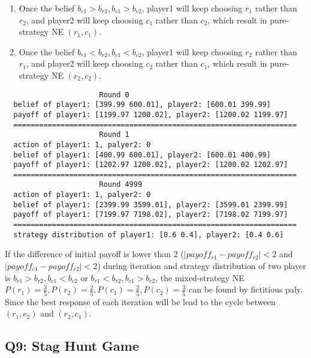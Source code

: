 \documentclass[a4paper, oneside, final, 12pt]{scrartcl} %
\begin{document}
\begin{enumerate}
  \item Once the belief $b_{r1} > b_{r2}, b_{c1} > b_{c2}$,
  player1 will keep choosing $r_1$ rather than $r_2$, 
  and player2 will keep choosing $c_1$ rather than $c_2$, 
  which result in pure-strategy NE $(r_1, c_1)$.
  \item Once the belief $b_{r1} < b_{r2}, b_{c1} < b_{c2}$,
  player1 will keep choosing $r_2$ rather than $r_1$, 
  and player2 will keep choosing $c_2$ rather than $c_1$, 
  which result in pure-strategy NE $(r_2, c_2)$.
\end{enumerate}
\endgroup

\newpage

\begin{lstlisting}
                      Round 0
  belief of player1: [399.99 600.01], player2: [600.01 399.99]
  payoff of player1: [1199.97 1200.02], player2: [1200.02 1199.97]
  ==================================================================
                      Round 1
  action of player1: 1, palyer2: 0
  belief of player1: [400.99 600.01], player2: [600.01 400.99]
  payoff of player1: [1202.97 1200.02], player2: [1200.02 1202.97]
  ==================================================================
                      Round 4999
  action of player1: 1, palyer2: 0
  belief of player1: [2399.99 3599.01], player2: [3599.01 2399.99]
  payoff of player1: [7199.97 7198.02], player2: [7198.02 7199.97]
  ==================================================================
  strategy distribution of player1: [0.6 0.4], player2: [0.4 0.6]
\end{lstlisting}

\begingroup
\raggedright
If the difference of initial payoff is lower than 2
($|payoff_{r1} - payoff_{r2}| < 2$ and $|payoff_{c1} - payoff_{c2}| < 2$) during iteration
and strategy distribution of two player is 
$b_{r1} > b_{r2}, b_{c1} < b_{c2}$  or  $b_{r1} < b_{r2}, b_{c1} > b_{c2}$, 
the mixed-strategy NE $P(r_1) = \frac{3}{5}, P(r_2) = \frac{2}{5}, 
P(c_1) = \frac{2}{5}, P(c_2) = \frac{3}{5}$ can be found by fictitious paly.
Since the best response of each iteration will be lead to the cycle 
between $(r_1, c_2)$ and $(r_2, c_1)$.
\endgroup

\subsection{Q9: Stag Hunt Game}
\end{document}
